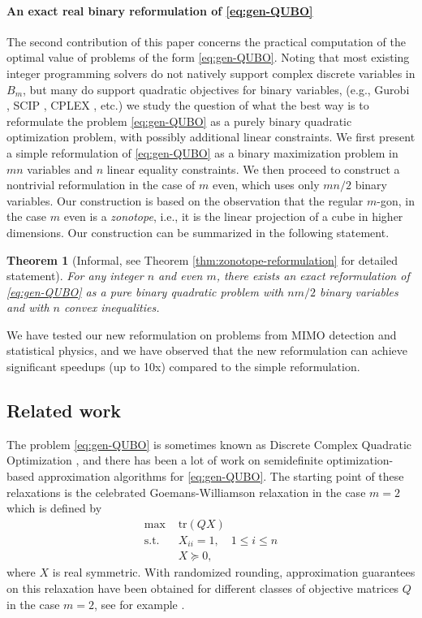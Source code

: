 \documentclass{article}
\newtheorem{theorem}{Theorem}
\theoremstyle{definition}
\begin{document}
\paragraph{An exact real binary reformulation of \eqref{eq:gen-QUBO}} The second contribution of this paper concerns the practical computation of the optimal value of problems of the form \eqref{eq:gen-QUBO}. Noting that most existing integer programming solvers do not natively support complex discrete variables in $B_m$, but many do support quadratic objectives for binary variables, (e.g., Gurobi \cite{gurobi}, SCIP \cite{bolusani2024scip}, CPLEX \cite{cplex2009v12}, etc.) we study the question of what the best way is to reformulate the problem \eqref{eq:gen-QUBO} as a purely binary quadratic optimization problem, with possibly additional linear constraints. We first present a simple reformulation of \eqref{eq:gen-QUBO} as a binary maximization problem in $mn$ variables and $n$ linear equality constraints. We then proceed to construct a nontrivial reformulation in the case of $m$ even, which uses only $mn/2$ binary variables.
Our construction is based on the observation that the regular $m$-gon, in the case $m$ even is a \emph{zonotope}, i.e., it is the linear projection of a cube in higher dimensions. Our construction can be summarized in the following statement.
\begin{theorem}[Informal, see Theorem \ref{thm:zonotope-reformulation} for detailed statement]

For any integer $n$ and even $m$, there exists an exact reformulation of \eqref{eq:gen-QUBO} as a pure binary quadratic problem with $nm/2$ binary variables and with $n$ convex inequalities.
\end{theorem}
We have tested our new reformulation on problems from MIMO detection and statistical physics, and we have observed that the new reformulation can achieve significant speedups (up to 10x) compared to the simple reformulation.

\subsection{Related work}

The problem \eqref{eq:gen-QUBO} is sometimes known as Discrete Complex Quadratic Optimization \cite{zhang2006complex,huang2010approximation,so2007approximating}, 
and there has been a lot of work on semidefinite optimization-based approximation algorithms for \eqref{eq:gen-QUBO}. The starting point of these relaxations is the celebrated Goemans-Williamson relaxation in the case $m=2$ which is defined by
\begin{equation}
\label{eq:QUBO-SDP}
\begin{aligned}
        \text{max } & \text{tr}(QX)\\
        \text{s.t. }&  X_{ii}=1,\quad 1\le i\le n\\
        & X\succeq 0,
\end{aligned}
\end{equation}
where $X$ is real symmetric.
With randomized rounding, approximation guarantees on this relaxation have been obtained for different classes of objective matrices $Q$ in the case $m=2$, see for example \cite[Chapter 2]{blekherman2012semidefinite}.
\end{document}
